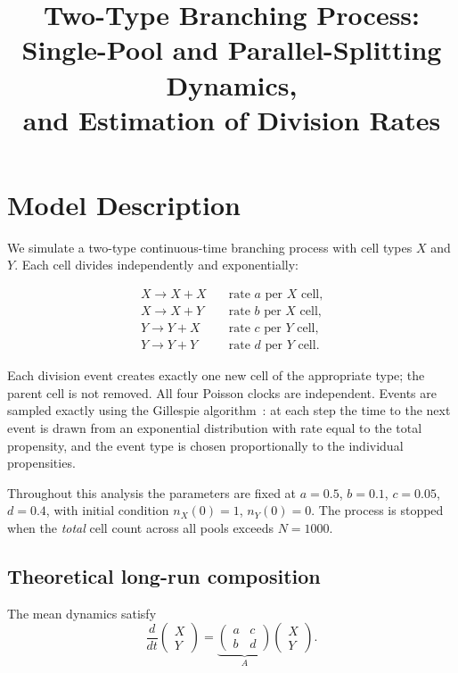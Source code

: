 \documentclass[12pt]{article}
\title{Two-Type Branching Process:\\
       Single-Pool and Parallel-Splitting Dynamics,\\
       and Estimation of Division Rates}
\author{}
\date{}
\begin{document}
\maketitle

\section{Model Description}
\label{sec:model}

We simulate a two-type continuous-time branching process with cell types $X$
and $Y$.  Each cell divides independently and exponentially:

\begin{align}
  X \to X + X & \quad \text{rate } a \text{ per } X \text{ cell,} \\
  X \to X + Y & \quad \text{rate } b \text{ per } X \text{ cell,} \\
  Y \to Y + X & \quad \text{rate } c \text{ per } Y \text{ cell,} \\
  Y \to Y + Y & \quad \text{rate } d \text{ per } Y \text{ cell.}
\end{align}

Each division event creates exactly one new cell of the appropriate type;
the parent cell is not removed.  All four Poisson clocks are independent.
Events are sampled exactly using the Gillespie
algorithm~\cite{gillespie1977,gillespie1976}: at each step the time to the
next event is drawn from an exponential distribution with rate equal to the
total propensity, and the event type is chosen proportionally to the
individual propensities.

Throughout this analysis the parameters are fixed at
$a = 0.5$, $b = 0.1$, $c = 0.05$, $d = 0.4$, with initial condition
$n_X(0) = 1$, $n_Y(0) = 0$.  The process is stopped when the \emph{total}
cell count across all pools exceeds $N = 1000$.

\subsection{Theoretical long-run composition}

The mean dynamics satisfy
\[
  \frac{d}{dt}\begin{pmatrix}X\\Y\end{pmatrix}
  = \underbrace{\begin{pmatrix}a & c \\ b & d\end{pmatrix}}_{A}
    \begin{pmatrix}X\\Y\end{pmatrix}.
\]
\end{document}
